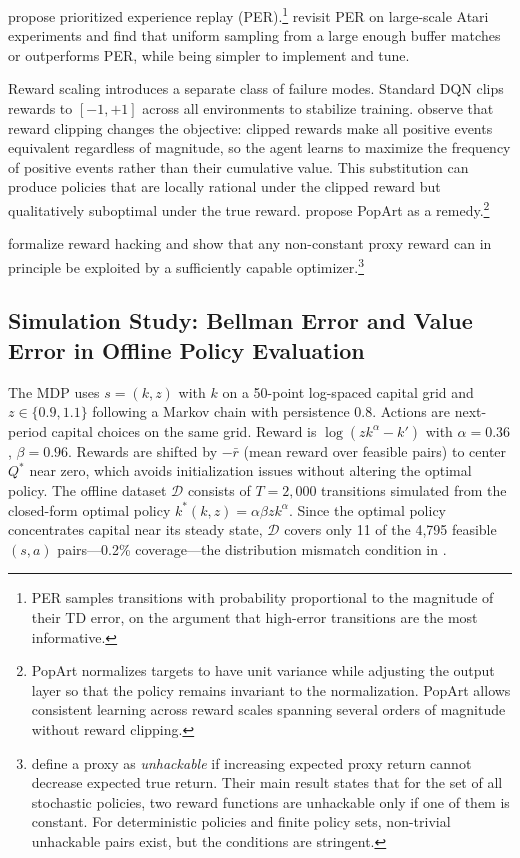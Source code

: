 \citet{schaul2016prioritized} propose prioritized experience replay (PER).\footnote{PER samples transitions with probability proportional to the magnitude of their TD error, on the argument that high-error transitions are the most informative.} \citet{fedus2020revisiting} revisit PER on large-scale Atari experiments and find that uniform sampling from a large enough buffer matches or outperforms PER, while being simpler to implement and tune.

Reward scaling introduces a separate class of failure modes. Standard DQN \citep{mnih2015} clips rewards to $[-1, +1]$ across all environments to stabilize training. \citet{vanHasselt2016popart} observe that reward clipping changes the objective: clipped rewards make all positive events equivalent regardless of magnitude, so the agent learns to maximize the frequency of positive events rather than their cumulative value. This substitution can produce policies that are locally rational under the clipped reward but qualitatively suboptimal under the true reward. \citet{vanHasselt2016popart} propose PopArt as a remedy.\footnote{PopArt normalizes targets to have unit variance while adjusting the output layer so that the policy remains invariant to the normalization. PopArt allows consistent learning across reward scales spanning several orders of magnitude without reward clipping.}

\citet{Skalse2022} formalize reward hacking and show that any non-constant proxy reward can in principle be exploited by a sufficiently capable optimizer.\footnote{\citet{Skalse2022} define a proxy as \emph{unhackable} if increasing expected proxy return cannot decrease expected true return. Their main result states that for the set of all stochastic policies, two reward functions are unhackable only if one of them is constant. For deterministic policies and finite policy sets, non-trivial unhackable pairs exist, but the conditions are stringent.}

\subsection{Simulation Study: Bellman Error and Value Error in Offline Policy Evaluation}
\label{sec:bellman_sim}

The MDP uses $s = (k, z)$ with $k$ on a 50-point log-spaced capital grid and $z \in \{0.9, 1.1\}$ following a Markov chain with persistence 0.8. Actions are next-period capital choices on the same grid. Reward is $\log(zk^\alpha - k')$ with $\alpha = 0.36$, $\beta = 0.96$. Rewards are shifted by $-\bar{r}$ (mean reward over feasible pairs) to center $Q^*$ near zero, which avoids initialization issues without altering the optimal policy. The offline dataset $\mathcal{D}$ consists of $T = 2{,}000$ transitions simulated from the closed-form optimal policy $k^*(k,z) = \alpha\beta z k^\alpha$. Since the optimal policy concentrates capital near its steady state, $\mathcal{D}$ covers only 11 of the 4,795 feasible $(s,a)$ pairs---0.2\% coverage---the distribution mismatch condition in \citet[Corollary~1]{Fujimoto2022}.

